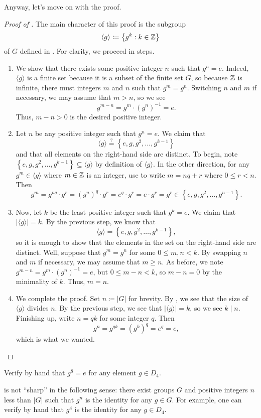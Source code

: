 \documentclass[../main.tex]{subfiles}
\begin{document}
Anyway, let's move on with the proof.
\begin{proof}[Proof of ]
    The main character of this proof is the subgroup
    \[\langle g\rangle\coloneqq\left\{g^k:k\in\mathbb Z\right\}\]
    of $G$ defined in . For clarity, we proceed in steps.
    \begin{enumerate}
        \item We show that there exists some positive integer $n$ such that $g^n=e$. Indeed, $\langle g\rangle$ is a finite set because it is a subset of the finite set $G$, so because $\mathbb Z$ is infinite, there must integers $m$ and $n$ such that $g^m=g^n$. Switching $n$ and $m$ if necessary, we may assume that $m>n$, so we see
        \[g^{m-n}=g^m\cdot\left(g^n\right)^{-1}=e.\]
        Thus, $m-n>0$ is the desired positive integer.
        \item Let $n$ be any positive integer such that $g^n=e$. We claim that
        \[\langle g\rangle\stackrel?=\left\{e,g,g^2,\ldots,g^{k-1}\right\}\]
        and that all elements on the right-hand side are distinct. To begin, note $\left\{e,g,g^2,\ldots,g^{k-1}\right\}\subseteq\langle g\rangle$ by definition of $\langle g\rangle$. In the other direction, for any $g^{m}\in\langle g\rangle$ where $m\in\mathbb Z$ is an integer, use  to write $m=nq+r$ where $0\le r<n$. Then
        \[g^{m}=g^{nq}\cdot g^r=\left(g^n\right)^q\cdot g^r=e^q\cdot g^r=e\cdot g^r=g^r\in\left\{e,g,g^2,\ldots,g^{n-1}\right\}.\]
        \item Now, let $k$ be the least positive integer such that $g^k=e$. We claim that $\left|\langle g\rangle\right|=k$. By the previous step, we know that
        \[\langle g\rangle=\left\{e,g,g^2,\ldots,g^{k-1}\right\},\]
        so it is enough to show that the elements in the set on the right-hand side are distinct. Well, suppose that $g^m=g^n$ for some $0\le m,n<k$. By swapping $n$ and $m$ if necessary, we may assume that $m\ge n$. As before, we note $g^{m-n}=g^m\cdot\left(g^n\right)^{-1}=e$, but $0\le m-n<k$, so $m-n=0$ by the minimality of $k$. Thus, $m=n$.
        \item We complete the proof. Set $n\coloneqq\left|G\right|$ for brevity. By , we see that the size of $\langle g\rangle$ divides $n$. By the previous step, we see that $\left|\langle g\rangle\right|=k$, so we see $k\mid n$. Finishing up, write $n=qk$ for some integer $q$. Then
        \[g^n=g^{qk}=\left(g^k\right)^q=e^q=e,\]
        which is what we wanted.
        \qedhere
    \end{enumerate}
\end{proof}
\begin{exe}
    Verify by hand that $g^8=e$ for any element $g\in D_4$.
\end{exe}
\begin{remark}
     is not ``sharp'' in the following sense: there exist groups $G$ and positive integers $n$ less than $\left|G\right|$ such that $g^n$ is the identity for any $g\in G$. For example, one can verify by hand that $g^4$ is the identity for any $g\in D_4$.
\end{remark}
\end{document}
